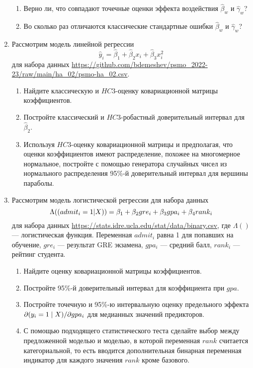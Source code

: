\documentclass[12pt]{article}
\let\P\relax
\DeclareMathOperator{\P}{\mathbb{P}}
\begin{document}
\begin{enumerate}
\begin{enumerate}
    \item Верно ли, что совпадают точечные оценки эффекта воздействия $\hat\beta_w$ и $\hat\gamma_w$?
    \item Во сколько раз отличаются классические стандартные ошибки $\hat\beta_w$ и $\hat\gamma_w$?
\end{enumerate}


\newpage
\item Рассмотрим модель линейной регрессии 
    \[
    \hat y_i = \hat \beta_1 + \hat\beta_2 x_i + \hat\beta_3 x_i^2
    \]
    для набора данных \url{https://github.com/bdemeshev/psmo_2022-23/raw/main/ha_02/psmo-ha_02.csv}.
    \begin{enumerate}
    \item Найдите классическую и $HC3$-оценку ковариационной матрицы коэффициентов. 
    \item Постройте классический и $HC3$-робастный доверительный интервал для $\hat \beta_2$.
    \item Используя $HC3$-оценку ковариационной матрицы и предполагая, 
    что оценки коэффициентов имеют распределение, похожее на многомерное нормальное,
    постройте с помощью генератора случайных чисел из нормального распределения
    95\%-й доверительный интервал для вершины параболы. 
    \end{enumerate}

\item Рассмотрим модель логистической регрессии для набора данных 
\[
\Lambda(\P(admit_i = 1 |X)) = \beta_1 + \beta_2 gre_i + \beta_3 gpa_i + \beta_4 rank_i    
\]
для набора данных \url{https://stats.idre.ucla.edu/stat/data/binary.csv},
где $\Lambda()$ — логистическая функция.
Переменная $admit_i$ равна 1 для попавших на обучение, $gre_i$ — результат GRE экзамена,
$gpa_i$ — средний балл, $rank_i$ — рейтинг студента. 

\begin{enumerate}
    \item Найдите оценку ковариационной матрицы коэффициентов. 
    \item Постройте 95\%-й доверительный интервал для коэффициента при $gpa$. 
    \item Постройте точечную и 95\%-ю интервальную оценку предельного эффекта 
    $\partial \P(y_i = 1\mid X)/\partial gpa_i$ для медианных значений предикторов.
    \item С помощью подходящего статистического теста сделайте выбор между 
    предложенной моделью и моделью, в которой переменная $rank$ считается категориальной, 
    то есть вводится дополнительная бинарная переменная индикатор для каждого значения $rank$ кроме базового. 
\end{enumerate}


\end{enumerate}
\end{document}
